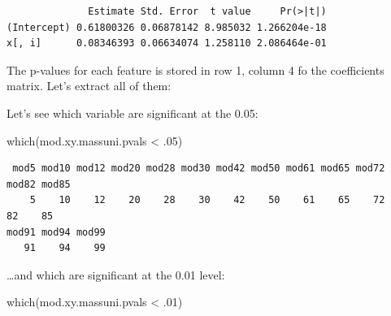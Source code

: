 \documentclass[
]{book}
\newenvironment{Shaded}{\begin{snugshade}}{\end{snugshade}}
\newcommand{\ControlFlowTok}[1]{\textcolor[rgb]{0.13,0.29,0.53}{\textbf{#1}}}
\newcommand{\DecValTok}[1]{\textcolor[rgb]{0.00,0.00,0.81}{#1}}
\newcommand{\FunctionTok}[1]{\textcolor[rgb]{0.00,0.00,0.00}{#1}}
\newcommand{\NormalTok}[1]{#1}
\newcommand{\OtherTok}[1]{\textcolor[rgb]{0.56,0.35,0.01}{#1}}
\newcommand{\SpecialCharTok}[1]{\textcolor[rgb]{0.00,0.00,0.00}{#1}}
\begin{document}
\begin{Shaded}
\end{Shaded}

\begin{verbatim}
              Estimate Std. Error  t value     Pr(>|t|)
(Intercept) 0.61800326 0.06878142 8.985032 1.266204e-18
x[, i]      0.08346393 0.06634074 1.258110 2.086464e-01
\end{verbatim}

The p-values for each feature is stored in row 1, column 4 fo the coefficients matrix. Let's extract all of them:

\begin{Shaded}
\end{Shaded}

Let's see which variable are significant at the 0.05:

\begin{Shaded}
\begin{Highlighting}[]
\FunctionTok{which}\NormalTok{(mod.xy.massuni.pvals }\SpecialCharTok{\textless{}}\NormalTok{ .}\DecValTok{05}\NormalTok{)}
\end{Highlighting}
\end{Shaded}

\begin{verbatim}
 mod5 mod10 mod12 mod20 mod28 mod30 mod42 mod50 mod61 mod65 mod72 mod82 mod85 
    5    10    12    20    28    30    42    50    61    65    72    82    85 
mod91 mod94 mod99 
   91    94    99 
\end{verbatim}

\ldots and which are significant at the 0.01 level:

\begin{Shaded}
\begin{Highlighting}[]
\FunctionTok{which}\NormalTok{(mod.xy.massuni.pvals }\SpecialCharTok{\textless{}}\NormalTok{ .}\DecValTok{01}\NormalTok{)}
\end{Highlighting}
\end{Shaded}
\end{document}
